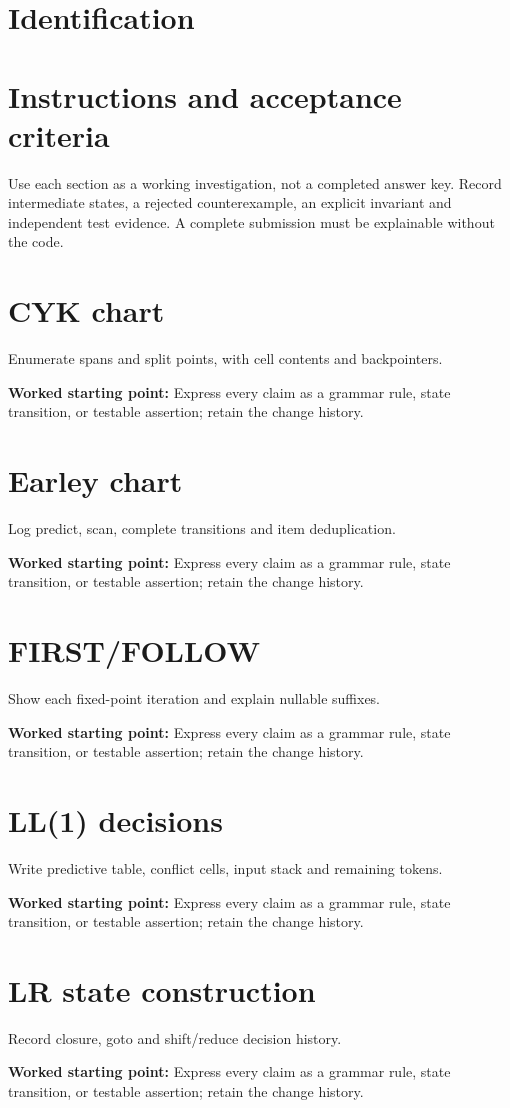 \documentclass[11pt,letterpaper]{article}
\begin{document}
\makedoctitle\makedocsummary
\tableofcontents\clearpage
\section{Identification}
\section{Instructions and acceptance criteria}
Use each section as a working investigation, not a completed answer key. Record intermediate states, a rejected counterexample, an explicit invariant and independent test evidence. A complete submission must be explainable without the code.
\section{CYK chart}
Enumerate spans and split points, with cell contents and backpointers.\par\textbf{Worked starting point:} Express every claim as a grammar rule, state transition, or testable assertion; retain the change history.
\section{Earley chart}
Log predict, scan, complete transitions and item deduplication.\par\textbf{Worked starting point:} Express every claim as a grammar rule, state transition, or testable assertion; retain the change history.
\section{FIRST/FOLLOW}
Show each fixed-point iteration and explain nullable suffixes.\par\textbf{Worked starting point:} Express every claim as a grammar rule, state transition, or testable assertion; retain the change history.
\section{LL(1) decisions}
Write predictive table, conflict cells, input stack and remaining tokens.\par\textbf{Worked starting point:} Express every claim as a grammar rule, state transition, or testable assertion; retain the change history.
\section{LR state construction}
Record closure, goto and shift/reduce decision history.\par\textbf{Worked starting point:} Express every claim as a grammar rule, state transition, or testable assertion; retain the change history.
\end{document}
